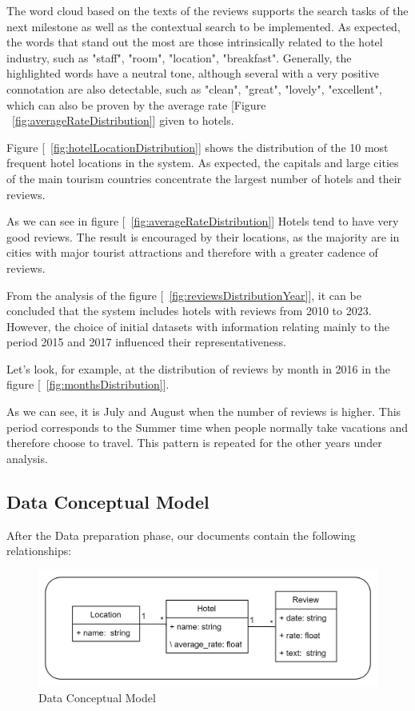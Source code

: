 \documentclass[sigconf]{acmart}
\begin{document}
The word cloud based on the texts of the reviews supports the search tasks of the next milestone as well as the contextual search to be implemented. As expected, the words that stand out the most are those intrinsically related to the hotel industry, such as "staff", "room", "location", "breakfast". Generally, the highlighted words have a neutral tone, although several with a very positive connotation are also detectable, such as "clean", "great", "lovely", "excellent", which can also be proven by the average rate [Figure ~\ref{fig:averageRateDistribution}] given to hotels.



Figure [~\ref{fig:hotelLocationDistribution}] shows the distribution of the 10 most frequent hotel locations in the system. As expected, the capitals and large cities of the main tourism countries concentrate the largest number of hotels and their reviews.



As we can see in figure [~\ref{fig:averageRateDistribution}] Hotels tend to have very good reviews. The result is encouraged by their locations, as the majority are in cities with major tourist attractions and therefore with a greater cadence of reviews.


From the analysis of the figure [~\ref{fig:reviewsDistributionYear}], it can be concluded that the system includes hotels with reviews from 2010 to 2023. However, the choice of initial datasets with information relating mainly to the period 2015 and 2017 influenced their representativeness.

Let's look, for example, at the distribution of reviews by month in 2016 in the figure [~\ref{fig:monthsDistribution}].

As we can see, it is July and August when the number of reviews is higher. This period corresponds to the Summer time when people normally take vacations and therefore choose to travel. This pattern is repeated for the other years under analysis.

\subsection{Data Conceptual Model}

After the Data preparation phase, our documents contain the following relationships:

\begin{figure}[H]
  \centering
  \includegraphics[width=\linewidth]{imgs/UML.png}
  \caption{Data Conceptual Model}
  \label{fig:uml}
\end{figure}
\end{document}
